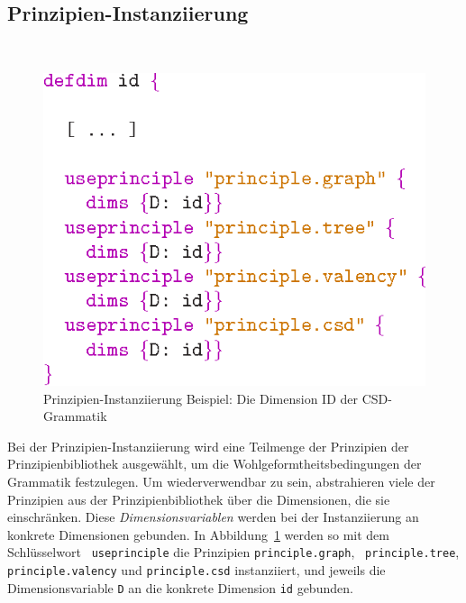 \subsection{Prinzipien-Instanziierung}~\\

\begin{figure}[!ht]
\begin{center}
\includegraphics[scale=1.0]{eps/useprinciples}
\end{center}


\caption{Prinzipien-Instanziierung Beispiel: Die Dimension ID der CSD-Grammatik}
\label{definstant}
\end{figure}

Bei der Prinzipien-Instanziierung wird eine Teilmenge der Prinzipien
der Prinzipienbibliothek ausgew\"ahlt, um die
Wohlgeformtheitsbedingungen der Grammatik festzulegen. Um
wiederverwendbar zu sein, abstrahieren viele der Prinzipien aus der
Prinzipienbibliothek \"uber die Dimensionen, die sie
einschr\"anken. Diese \emph{Dimensionsvariablen} werden bei der
Instanziierung an konkrete Dimensionen gebunden.  In
Abbildung~\ref{definstant} werden so mit dem Schl\"usselwort {\tt
useprinciple} die Prinzipien {\tt principle.graph}, {\tt
principle.tree}, {\tt principle.valency} und {\tt principle.csd}
instanziiert, und jeweils die Dimensionsvariable {\tt D} an die
konkrete Dimension {\tt id} gebunden.

